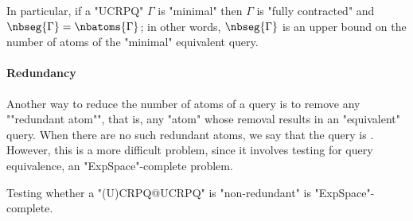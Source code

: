 In particular, if a "UCRPQ" $\Gamma$ is "minimal" then $\Gamma$ is "fully contracted" and $\nbseg{\Gamma} = \nbatoms{\Gamma}$; in other words, $\nbseg{\Gamma}$ is an upper bound on the number of atoms of the "minimal" equivalent query.

\paragraph{Redundancy}
Another way to reduce the number of atoms of a query is to remove any \AP""redundant atom"", that is, any "atom" whose removal results in an "equivalent" query. 
When there are no such redundant atoms, we say that the query is .
However, this is a more difficult problem, since it involves testing for query equivalence, an "ExpSpace"-complete problem.

\begin{proposition}
	\AP\label{prop:lowerbound-non-redundant}
	Testing whether a "(U)CRPQ@UCRPQ" is "non-redundant" is "ExpSpace"-complete.
\end{proposition}

